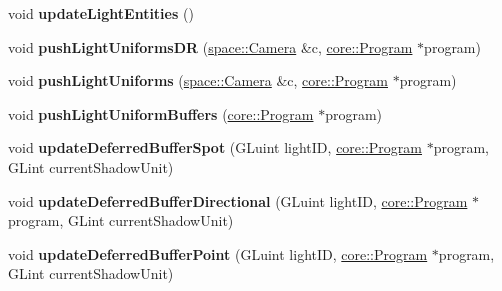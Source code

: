 \begin{DoxyCompactItemize}
\item 
\hypertarget{classfillwave_1_1manager_1_1LightManager_a71ba67dac4b0e50d1e0170245a556c8a}{}void {\bfseries update\+Light\+Entities} ()\label{classfillwave_1_1manager_1_1LightManager_a71ba67dac4b0e50d1e0170245a556c8a}

\item 
\hypertarget{classfillwave_1_1manager_1_1LightManager_a6400031ac36e11f63bc889391370f677}{}void {\bfseries push\+Light\+Uniforms\+D\+R} (\hyperlink{classfillwave_1_1space_1_1Camera}{space\+::\+Camera} \&c, \hyperlink{classfillwave_1_1core_1_1Program}{core\+::\+Program} $\ast$program)\label{classfillwave_1_1manager_1_1LightManager_a6400031ac36e11f63bc889391370f677}

\item 
\hypertarget{classfillwave_1_1manager_1_1LightManager_a4660bf4b9375e971a8b5fef9c0f222d3}{}void {\bfseries push\+Light\+Uniforms} (\hyperlink{classfillwave_1_1space_1_1Camera}{space\+::\+Camera} \&c, \hyperlink{classfillwave_1_1core_1_1Program}{core\+::\+Program} $\ast$program)\label{classfillwave_1_1manager_1_1LightManager_a4660bf4b9375e971a8b5fef9c0f222d3}

\item 
\hypertarget{classfillwave_1_1manager_1_1LightManager_a38547c86c5c918f4f14e2f95ae4c65b7}{}void {\bfseries push\+Light\+Uniform\+Buffers} (\hyperlink{classfillwave_1_1core_1_1Program}{core\+::\+Program} $\ast$program)\label{classfillwave_1_1manager_1_1LightManager_a38547c86c5c918f4f14e2f95ae4c65b7}

\item 
\hypertarget{classfillwave_1_1manager_1_1LightManager_a12236bb6d0781301f3c5987dade6995c}{}void {\bfseries update\+Deferred\+Buffer\+Spot} (G\+Luint light\+I\+D, \hyperlink{classfillwave_1_1core_1_1Program}{core\+::\+Program} $\ast$program, G\+Lint current\+Shadow\+Unit)\label{classfillwave_1_1manager_1_1LightManager_a12236bb6d0781301f3c5987dade6995c}

\item 
\hypertarget{classfillwave_1_1manager_1_1LightManager_a4caeaf8a6af34c192201c17342ca4159}{}void {\bfseries update\+Deferred\+Buffer\+Directional} (G\+Luint light\+I\+D, \hyperlink{classfillwave_1_1core_1_1Program}{core\+::\+Program} $\ast$program, G\+Lint current\+Shadow\+Unit)\label{classfillwave_1_1manager_1_1LightManager_a4caeaf8a6af34c192201c17342ca4159}

\item 
\hypertarget{classfillwave_1_1manager_1_1LightManager_ac1a3eaacb3933a6373b9774a05f5fd61}{}void {\bfseries update\+Deferred\+Buffer\+Point} (G\+Luint light\+I\+D, \hyperlink{classfillwave_1_1core_1_1Program}{core\+::\+Program} $\ast$program, G\+Lint current\+Shadow\+Unit)\label{classfillwave_1_1manager_1_1LightManager_ac1a3eaacb3933a6373b9774a05f5fd61}


\end{DoxyCompactItemize}
